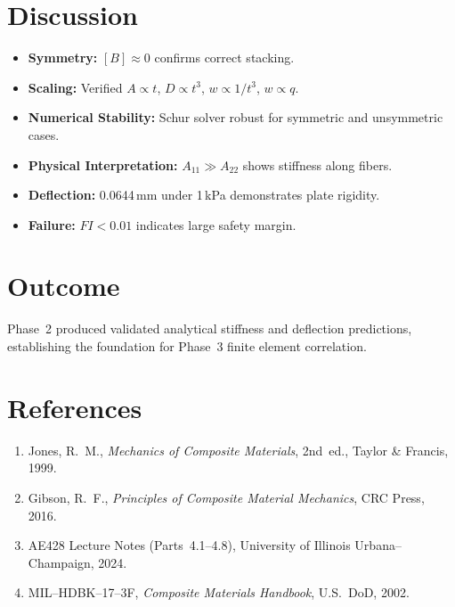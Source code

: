 \documentclass[12pt,a4paper]{article}
\begin{document}
\section{Discussion}
\begin{itemize}
\item \textbf{Symmetry:} $[B]\approx0$ confirms correct stacking.
\item \textbf{Scaling:} Verified $A\propto t$, $D\propto t^3$, $w\propto 1/t^3$, $w\propto q$.
\item \textbf{Numerical Stability:} Schur solver robust for symmetric and unsymmetric cases.
\item \textbf{Physical Interpretation:} $A_{11}\!\gg\!A_{22}$ shows stiffness along fibers.
\item \textbf{Deflection:} 0.0644\,mm under 1\,kPa demonstrates plate rigidity.
\item \textbf{Failure:} $FI<0.01$ indicates large safety margin.
\end{itemize}

\section{Outcome}
Phase~2 produced validated analytical stiffness and deflection predictions, establishing the foundation for
Phase~3 finite element correlation.

\section*{References}
\begin{enumerate}
\item Jones, R.~M., \emph{Mechanics of Composite Materials}, 2nd~ed., Taylor \& Francis, 1999.
\item Gibson, R.~F., \emph{Principles of Composite Material Mechanics}, CRC Press, 2016.
\item AE428 Lecture Notes (Parts~4.1--4.8), University of Illinois Urbana--Champaign, 2024.
\item MIL--HDBK--17--3F, \emph{Composite Materials Handbook}, U.S.~DoD, 2002.
\end{enumerate}
\end{document}
